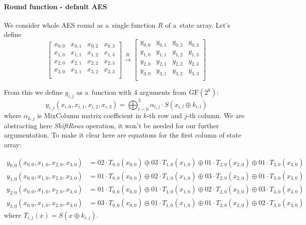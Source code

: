 \documentclass[11pt,oneside,final]{fithesis2}
\newcommand{\gfe}{\ensuremath{\text{GF}\left(2^8\right)}}
\begin{document}
	\paragraph*{Round function - default AES}
	We consider whole AES round as a~single function $R$ of a~state array. Let's define
	\[
	\begin{bmatrix} 
	    x_{0,0} & x_{0,1} & x_{0,2} & x_{0,3}\\
	    x_{1,0} & x_{1,1} & x_{1,2} & x_{1,3}\\
	    x_{2,0} & x_{2,1} & x_{2,2} & x_{2,3}\\
	    x_{3,0} & x_{3,1} & x_{3,2} & x_{3,3}\\
	\end{bmatrix} 
	\overset{R}{\longrightarrow}
	\begin{bmatrix} 
	    y_{0,0} & y_{0,1} & y_{0,2} & y_{0,3}\\
	    y_{1,0} & y_{1,1} & y_{1,2} & y_{1,3}\\
	    y_{2,0} & y_{2,1} & y_{2,2} & y_{2,3}\\
	    y_{3,0} & y_{3,1} & y_{3,2} & y_{3,3}\\
	\end{bmatrix} 
	\]

	From this we define $y_{i,j}$ as a~function with 4 arguments from $\gfe$:
	\begin{equation}
	y_{i,j}\left(x_{i,0}, x_{i,1}, x_{i,2}, x_{i,3}\right) = \bigoplus^3_{l=0} \alpha_{l,j} \cdot S(x_{i,l} \oplus k_{i,l})
	\end{equation}
	where $\alpha_{k,j}$ is MixColumn matrix coefficient in $k$-th row and $j$-th column. We are abstracting here \emph{ShiftRows} operation, it won't be needed for our further argumentation.
	To make it clear here are equations for the first column of state array:

	{\footnotesize
	\begin{subequations}
	\begin{align}
	y_{0,0}\left(x_{0,0}, x_{1,0}, x_{2,0}, x_{3,0}\right) &= 02 \cdot T_{0,0}(x_{0,0}) \oplus 03 \cdot T_{1,0}(x_{1,0})\oplus 01 \cdot T_{2,0}(x_{2,0})\oplus 01 \cdot T_{3,0}(x_{3,0})\\
	y_{1,0}\left(x_{0,0}, x_{1,0}, x_{2,0}, x_{3,0}\right) &= 01 \cdot T_{0,0}(x_{0,0}) \oplus 02 \cdot T_{1,0}(x_{1,0})\oplus 03 \cdot T_{2,0}(x_{2,0})\oplus 01 \cdot T_{3,0}(x_{3,0})\\
	y_{2,0}\left(x_{0,0}, x_{1,0}, x_{2,0}, x_{3,0}\right) &= 01 \cdot T_{0,0}(x_{0,0}) \oplus 01 \cdot T_{1,0}(x_{1,0})\oplus 02 \cdot T_{2,0}(x_{2,0})\oplus 03 \cdot T_{3,0}(x_{3,0})\\
	y_{3,0}\left(x_{0,0}, x_{1,0}, x_{2,0}, x_{3,0}\right) &= 03 \cdot T_{0,0}(x_{0,0}) \oplus 01 \cdot T_{1,0}(x_{1,0})\oplus 01 \cdot T_{2,0}(x_{2,0})\oplus 02 \cdot T_{3,0}(x_{3,0})
	\end{align}
	\end{subequations}}
	where $T_{i,j}(x) = S\left(x \oplus k_{i,j}\right)$.
\end{document}
